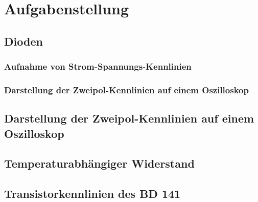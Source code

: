 \section{Aufgabenstellung}
\subsection{Dioden}
\subsubsection*{Aufnahme von Strom-Spannungs-Kennlinien }
\subsubsection*{Darstellung der Zweipol-Kennlinien auf einem Oszilloskop}
\subsubsection*{}
\subsubsection*{}
\subsection{Darstellung der Zweipol-Kennlinien auf einem Oszilloskop}
\subsection{Temperaturabhängiger Widerstand }
\subsubsection*{}
\subsection{Transistorkennlinien des BD 141 }
\subsubsection*{}
